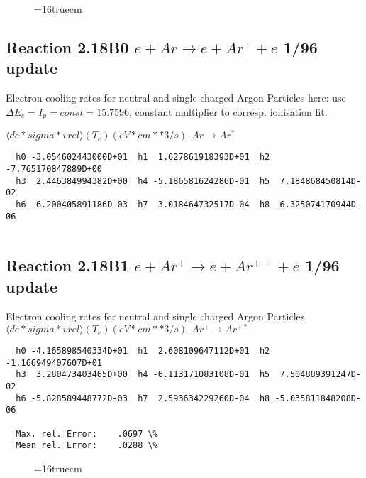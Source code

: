 \documentclass[12pt,dvipdfmx]{article}
\begin{document}
\begin{figure} \label{2.10l}
\epsfxsize=16truecm
\end{figure}
\newpage

\subsection{
Reaction 2.18B0 $e + Ar  \rightarrow e + Ar^+  + e$ 1/96 update
}

  Electron cooling rates for neutral and single
  charged Argon Particles
  here: use $\Delta E_e = I_p = const = 15.7596$,
  constant multiplier to corresp. ionisation fit.

 $ \langle de*sigma*vrel \rangle(T_e)  (eV*cm**3/s), Ar  \rightarrow Ar^* $

\begin{small}\begin{verbatim}
  h0 -3.054602443000D+01  h1  1.627861918393D+01  h2 -7.765170847889D+00
  h3  2.446384994382D+00  h4 -5.186581624286D-01  h5  7.184868450814D-02
  h6 -6.200405891186D-03  h7  3.018464732517D-04  h8 -6.325074170944D-06


\end{verbatim}\end{small}


\subsection{
Reaction 2.18B1 $e + Ar^+ \rightarrow e + Ar^{++} + e$ 1/96 update
}

  Electron cooling rates for neutral and single
  charged Argon Particles
 $  \langle de*sigma*vrel \rangle(T_e)  (eV*cm**3/s), Ar^+ \rightarrow Ar^{+*} $

\begin{small}\begin{verbatim}
  h0 -4.165898540334D+01  h1  2.608109647112D+01  h2 -1.166949407607D+01
  h3  3.280473403465D+00  h4 -6.113171083108D-01  h5  7.504889391247D-02
  h6 -5.828589448772D-03  h7  2.593634229260D-04  h8 -5.035811848208D-06

  Max. rel. Error:    .0697 \%
  Mean rel. Error:    .0288 \%

\end{verbatim}\end{small}

\begin{figure} \label{2.18Bl}
\epsfxsize=16truecm
\end{figure}
\newpage
\end{document}
